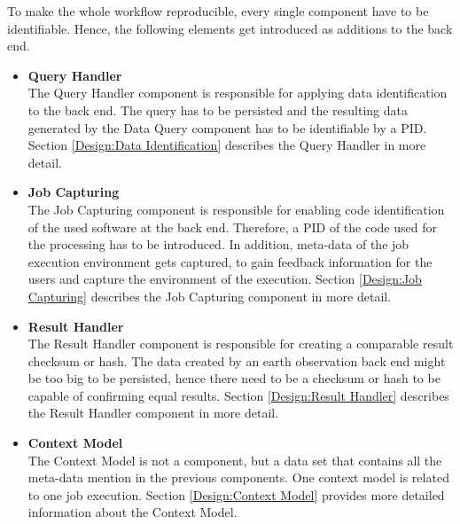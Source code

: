 \documentclass[draft,final]{vutinfth} %
\begin{document}
To make the whole workflow reproducible, every single component have to be identifiable. Hence, the following elements get introduced as additions to the back end.

 \begin{itemize}
	\item \textbf{Query Handler} \\
	The Query Handler component is responsible for applying data identification to the back end. The query has to be persisted and the resulting data generated by the Data Query component has to be identifiable by a PID. Section \ref{Design:Data Identification} describes the Query Handler in more detail.     
	\item \textbf{Job Capturing} \\ 
	The Job Capturing component is responsible for enabling code identification of the used software at the back end. Therefore, a PID of the code used for the processing has to be introduced. In addition, meta-data of the job execution environment gets captured, to gain feedback information for the users and capture the environment of the execution. Section \ref{Design:Job Capturing} describes the Job Capturing component in more detail.
	\item \textbf{Result Handler} \\
	The Result Handler component is responsible for creating a comparable result checksum or hash. The data created by an earth observation back end might be too big to be persisted, hence there need to be a checksum or hash to be capable of confirming equal results. Section \ref{Design:Result Handler} describes the Result Handler component in more detail.   
	\item \textbf{Context Model} \\ 
	The Context Model is not a component, but a data set that contains all the meta-data mention in the previous components. One context model is related to one job execution. Section \ref{Design:Context Model} provides more detailed information about the Context Model. 
\end{itemize}
\end{document}
